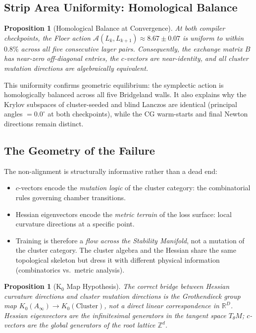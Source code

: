 \documentclass[11pt]{amsart}
\newtheorem{proposition}[theorem]{Proposition}
\begin{document}
\subsection{Strip Area Uniformity: Homological Balance}

\begin{proposition}[Homological Balance at Convergence]
At both compiler checkpoints, the Floer action
$\mathcal{A}(L_k, L_{k+1}) \approx 8.67 \pm 0.07$ is uniform
to within $0.8\%$ across all five consecutive layer pairs.
Consequently, the exchange matrix $B$ has near-zero off-diagonal entries,
the $c$-vectors are near-identity, and all cluster mutation directions
are algebraically equivalent.
\end{proposition}

This uniformity confirms geometric equilibrium: the symplectic action is
homologically balanced across all five Bridgeland walls.
It also explains why the Krylov subspaces of cluster-seeded and blind
Lanczos are identical (principal angles $= 0.0^\circ$ at both checkpoints),
while the CG warm-starts and final Newton directions remain distinct.

\subsection{The Geometry of the Failure}

The non-alignment is structurally informative rather than a dead end:
\begin{itemize}
\item $c$-vectors encode the \emph{mutation logic} of the cluster
  category: the combinatorial rules governing chamber transitions.
\item Hessian eigenvectors encode the \emph{metric terrain} of the loss
  surface: local curvature directions at a specific point.
\item Training is therefore a \emph{flow across the Stability Manifold},
  not a mutation of the cluster category.
  The cluster algebra and the Hessian share the same topological skeleton
  but dress it with different physical information
  (combinatorics vs.\ metric analysis).
\end{itemize}

\begin{proposition}[K$_0$ Map Hypothesis]
The correct bridge between Hessian curvature directions and cluster
mutation directions is the Grothendieck group map
$K_0(A_\infty) \to K_0(\mathrm{Cluster})$, not a direct linear
correspondence in $\mathbb{R}^D$.
Hessian eigenvectors are the infinitesimal generators in the tangent
space $T_\theta M$; $c$-vectors are the global generators of the root
lattice $\mathbb{Z}^d$.
\end{proposition}
\end{document}
